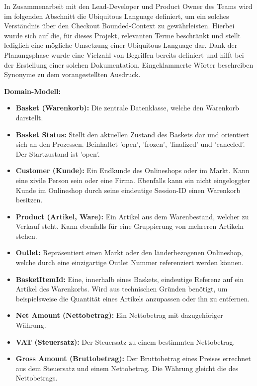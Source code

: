 In Zusammenarbeit mit den Lead-Developer und \Gls{Product Owner} des Teams wird im folgenden Abschnitt die Ubiquitous Language definiert, um ein solches Verständnis über den Checkout Bounded-Context zu gewährleisten. Hierbei wurde sich auf die, für dieses Projekt, relevanten Terme beschränkt und stellt lediglich eine mögliche Umsetzung einer Ubiquitous Language dar. Dank der Planungsphase wurde eine Vielzahl von Begriffen bereits definiert und hilft bei der Erstellung einer solchen Dokumentation. Eingeklammerte Wörter beschreiben Synonyme zu dem vorangestellten Ausdruck.

{\large \textbf{Domain-Modell:}}
\begin{itemize}
	\item \textbf{Basket (Warenkorb): } {Die zentrale Datenklasse, welche den Warenkorb darstellt.}
	\item \textbf{Basket Status: } {Stellt den aktuellen Zustand des Baskets dar und orientiert sich an den Prozessen. Beinhaltet 'open', 'frozen', 'finalized' und 'canceled'. Der Startzustand ist 'open'.}
	\item \textbf{Customer (Kunde): } {Ein Endkunde des Onlineshops oder im Markt. Kann eine zivile Person sein oder eine Firma. Ebenfalls kann ein nicht eingeloggter Kunde im Onlineshop durch seine eindeutige Session-ID einen Warenkorb besitzen.} %
	\item \textbf{Product (Artikel, Ware): } {Ein Artikel aus dem Warenbestand, welcher zu Verkauf steht. Kann ebenfalls für eine Gruppierung von mehreren Artikeln stehen.}
	\item \textbf{Outlet: } {Repräsentiert einen Markt oder den länderbezogenen Onlineshop, welche durch eine einzigartige Outlet Nummer referenziert werden können.}
	\item \textbf{BasketItemId: } {Eine, innerhalb eines Baskets, eindeutige Referenz auf ein Artikel des Warenkorbs. Wird aus technischen Gründen benötigt, um beispielsweise die Quantität eines Artikels anzupassen oder ihn zu entfernen.}
	\item \textbf{Net Amount (Nettobetrag): } {Ein Nettobetrag mit dazugehöriger Währung.} %
	\item \textbf{VAT (Steuersatz): } {Der Steuersatz zu einem bestimmten Nettobetrag.}
	\item \textbf{Gross Amount (Bruttobetrag): } {Der Bruttobetrag eines Preises errechnet aus dem Steuersatz und einem Nettobetrag. Die Währung gleicht die des Nettobetrags.}

\end{itemize}
